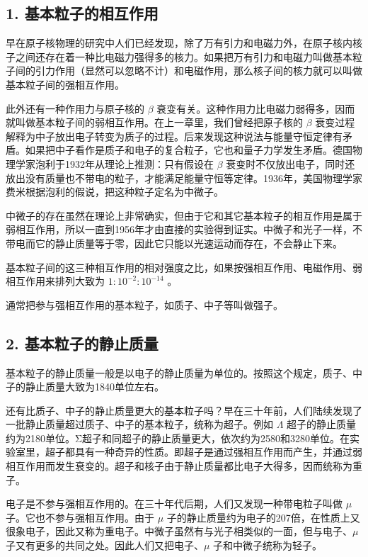 \subsection{1.
基本粒子的相互作用}

早在原子核物理的研究中人们已经发现，除了万有引力和电磁力外，在原子核内核子之间还存在着一种比电磁力强得多的核力。如果把万有引力和电磁力叫做基本粒子间的引力作用（显然可以忽略不计）和电磁作用，那么核子间的核力就可以叫做基本粒子间的强相互作用。

此外还有一种作用力与原子核的 \(\beta\)
衰变有关。这种作用力比电磁力弱得多，因而就叫做基本粒子间的弱相互作用。在上一章里，我们曾经把原子核的
\(\beta\)
衰变过程解释为中子放出电子转变为质子的过程。后来发现这种说法与能量守恒定律有矛盾。如果把中子看作是质子和电子的复合粒子，它也和量子力学发生矛盾。德国物理学家泡利于1932年从理论上推测：只有假设在
\(\beta\)
衰变时不仅放出电子，同时还放出没有质量也不带电的粒子，才能满足能量守恒等定律。1936年，美国物理学家费米根据泡利的假说，把这种粒子定名为中微子。

中微子的存在虽然在理论上非常确实，但由于它和其它基本粒子的相互作用是属于弱相互作用，所以一直到1956年才由直接的实验得到证实。中微子和光子一样，不带电而它的静止质量等于零，因此它只能以光速运动而存在，不会静止下来。

基本粒子间的这三种相互作用的相对强度之比，如果按强相互作用、电磁作用、弱相互作用来排列大致为
\(1:10^{-2}:10^{-14}\) 。

通常把参与强相互作用的基本粒子，如质子、中子等叫做强子。

\subsection{2.
基本粒子的静止质量}

基本粒子的静止质量一般是以电子的静止质量为单位的。按照这个规定，质子、中子的静止质量大致为1840单位左右。

还有比质子、中子的静止质量更大的基本粒子吗？早在三十年前，人们陆续发现了一批静止质量超过质子、中子的基本粒子，统称为超子。例如
\(\Lambda\)
超子的静止质量约为2180单位。Σ超子和同超子的静止质量更大，依次约为2580和3280单位。在实验室里，超子都具有一种奇异的性质。即超子是通过强相互作用而产生，并通过弱相互作用而发生衰变的。超子和核子由于静止质量都比电子大得多，因而统称为重子。

电子是不参与强相互作用的。在三十年代后期，人们又发现一种带电粒子叫做
\(\mu\) 子。它也不参与强相互作用。由于 \(\mu\)
子的静止质量约为电子的207倍，在性质上又很象电子，因此又称为重电子。中微子虽然有与光子相类似的一面，但与电子、\(\mu\)
子又有更多的共同之处。因此人们又把电子、\(\mu\) 子和中微子统称为轻子。

